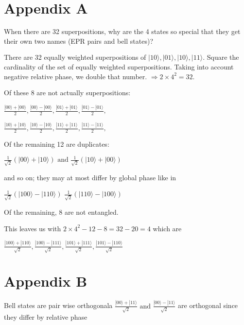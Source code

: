 \documentclass{article}
\newcommand{\0}{{$|0\rangle$}}
\newcommand{\1}{{$|1\rangle$}}
\begin{document}
\section{Appendix A}
When there are 32 superpositions, why are the 4 states so special that they get their own two names (EPR pairs and bell states)? 

There are 32 equally weighted superpositions of $|10\rangle, |01\rangle, |10\rangle, |11\rangle.$
Square the cardinality of the set of equally weighted superpositions. Taking into account negative relative phase, we double that number.
$\Rightarrow 2 \times 4^2 = 32.$ 

Of these 8 are not actually superpositions\footnotemark[5]:

$\frac{|00\rangle + |00\rangle}{2},\frac{ |00\rangle - |00\rangle}{2},\frac{ |01\rangle + |01\rangle}{2}, \frac{ |01\rangle - |01\rangle}{2}, $

$\frac{ |10\rangle + |10\rangle}{2},\frac{ |10\rangle - |10\rangle}{2},\frac{ |11\rangle + |11\rangle}{2},\frac{ |11\rangle - |11\rangle}{2}, $

Of the remaining 12 are duplicates:

$\frac{1}{\sqrt{2}}(|00\rangle + |10\rangle)  \text{ and } \frac{1}{\sqrt{2}}(|10\rangle + |00\rangle)$

and so on; they may at most differ by global phase like in

$\frac{1}{\sqrt{2}}(|100\rangle - |110\rangle)$ $\frac{1}{\sqrt{2}}(|110\rangle - |100\rangle)$

Of the remaining, 8 are not entangled.

This leaves us with $2\times4^2 - 12 - 8 = 32 - 20 = 4$ which are

$\frac{|100\rangle + |110\rangle}{\sqrt{2}}, 
\frac{|100\rangle - |111\rangle}{\sqrt{2}}, 
\frac{|101\rangle + |111\rangle}{\sqrt{2}},
\frac{|101\rangle - |110\rangle}{\sqrt{2}}$

\section{Appendix B}
Bell states are pair wise orthogonal\footnotemark[6]a
$\frac{|00\rangle + |11\rangle}{\sqrt{2}} \text{ and }
\frac{|00\rangle - |11\rangle}{\sqrt{2}}$ 
are orthogonal since they differ by relative phase
\end{document}
